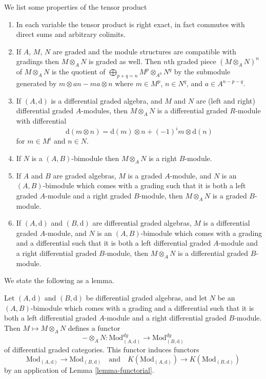 \medskip\noindent
We list some properties of the tensor product
\begin{enumerate}
\item In each variable the tensor product is right exact, in fact commutes
with direct sums and arbitrary colimits.
\item If $A$, $M$, $N$ are graded and the module structures are compatible
with gradings then $M \otimes_A N$ is graded as well.
Then $n$th graded piece $(M \otimes_A N)^n$ of $M \otimes_A N$
is the quotient of $\bigoplus_{p + q = n} M^p \otimes_{A^0} N^q$
by the submodule generated by $m \otimes an - ma \otimes n$ where
$m \in M^p$, $n \in N^q$, and $a \in A^{n - p - q}$.
\item If $(A, \text{d})$ is a differential graded algebra, and
$M$ and $N$ are (left and right) differential graded $A$-modules, then
$M \otimes_A N$ is a differential graded $R$-module with differential
$$
\text{d}(m \otimes n) = \text{d}(m) \otimes n + (-1)^im \otimes \text{d}(n)
$$
for $m \in M^i$ and $n \in N$.
\item If $N$ is a $(A, B)$-bimodule then $M \otimes_A N$ is a right
$B$-module.
\item If $A$ and $B$ are graded algebras,
$M$ is a graded $A$-module, and $N$ is an $(A, B)$-bimodule
which comes with a grading such that it is both
a left graded $A$-module and a right graded
$B$-module, then $M \otimes_A N$ is a graded $B$-module.
\item If $(A, \text{d})$ and $(B, \text{d})$ are differential graded algebras,
$M$ is a differential graded $A$-module, and $N$ is an $(A, B)$-bimodule
which comes with a grading and a differential such that it is both
a left differential graded $A$-module and a right differential graded
$B$-module, then $M \otimes_A N$ is a differential graded $B$-module.
\end{enumerate}
We state the following as a lemma.

\begin{lemma}
\label{lemma-tensor}
Let $(A, \text{d})$ and $(B, \text{d})$ be differential graded algebras,
and let $N$ be an $(A, B)$-bimodule which comes with a grading and a
differential such that it is both a left differential graded $A$-module
and a right differential graded $B$-module. Then
$M \mapsto M \otimes_A N$ defines a functor
$$
- \otimes_A N :
\text{Mod}^{dg}_{(A, \text{d})}
\longrightarrow
\text{Mod}^{dg}_{(B, \text{d})}
$$
of differential graded categories. This functor induces functors
$$
\text{Mod}_{(A, \text{d})} \to \text{Mod}_{(B, \text{d})}
\quad\text{and}\quad
K(\text{Mod}_{(A, \text{d})}) \to K(\text{Mod}_{(B, \text{d})})
$$
by an application of Lemma \ref{lemma-functorial}.
\end{lemma}

